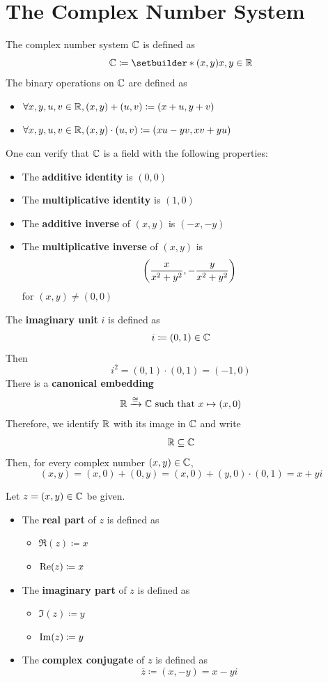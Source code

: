 \section{The Complex Number System}

The complex number system $\C$ is defined as
\[
\C \coloneqq \setbuilder*{(x, y)}{x, y \in \R}
\]
The binary operations on $\C$ are defined as
\begin{itemize}
    \item $\forall x,y,u,v \in \R, (x, y) + (u, v) \coloneqq (x + u, y + v)$
    \item $\forall x,y,u,v \in \R, (x, y) \cdot (u, v) \coloneqq (xu - yv, xv + yu)$
\end{itemize}

One can verify that $\C$ is a field with the following properties:
\begin{itemize}
    \item The \textbf{additive identity} is $(0, 0)$
    \item The \textbf{multiplicative identity} is $(1, 0)$
    \item The \textbf{additive inverse} of $(x, y)$ is $(-x, -y)$
    \item The \textbf{multiplicative inverse} of $(x, y)$ is
    \[
    \paren*{\frac{x}{x^{2} + y^{2}}, - \frac{y}{x^{2} + y^{2}}}
    \]
    for $(x, y) \neq (0, 0)$
\end{itemize}
The \textbf{imaginary unit} $i$ is defined as
\[
i \coloneqq (0, 1) \in \C
\]
Then
\[
i^{2} = (0, 1) \cdot (0, 1) = (-1, 0)
\]
There is a \textbf{canonical embedding}
\[
\R \xrightarrow{\cong} \C \text{ such that } x \mapsto (x, 0)
\]
Therefore, we identify $\R$ with its image in $\C$ and write
\[
\R \subseteq \C
\]
Then, for every complex number $(x, y) \in \C$,
\[
(x, y) = (x, 0) + (0, y) = (x, 0) + (y, 0) \cdot (0, 1) = x + yi
\]

\bigskip

\begin{definition} \label{an:def:real-part-imaginary-part-complex-conjugate}
    Let $z = (x, y) \in \C$ be given.
    \begin{itemize}
        \item The \textbf{real part} of $z$ is defined as
        \begin{itemize}
            \item $\Re(z) \coloneqq x$
            \item $\Real(z) \coloneqq x$
        \end{itemize}
        \item The \textbf{imaginary part} of $z$ is defined as
        \begin{itemize}
            \item $\Im(z) \coloneqq y$
            \item $\Imag(z) \coloneqq y$
        \end{itemize}
        \item The \textbf{complex conjugate} of $z$ is defined as
        \[
        \overline{z} \coloneqq (x, -y) = x - yi
        \]
    \end{itemize}
\end{definition}

